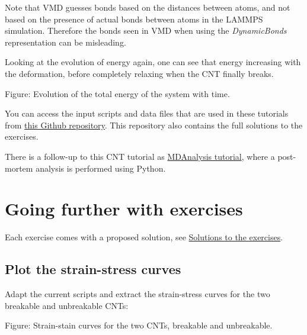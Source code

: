 \begin{tcolorbox}[colback=mylightblue!5!white,colframe=mylightblue!75!black,title=About bonds in VMD]

\vspace{0.25cm} \noindent Note that VMD guesses bonds based on the distances
between atoms, and not based on the presence of actual
bonds between atoms in the LAMMPS simulation. Therefore the bonds seen
in VMD when using the \textit{DynamicBonds} representation can be misleading.
\end{tcolorbox}

\noindent Looking at the evolution of energy again, one can see that energy increasing 
with the deformation, before completely relaxing when the CNT finally breaks.

\vspace{0.25cm} Figure: Evolution of the total energy of the system with time.

\vspace{0.25cm} \noindent You can access the input scripts and data files that
are used in these tutorials from \href{https://github.com/lammpstutorials/lammpstutorials-inputs/}{this Github repository}.
This repository also contains the full solutions to the exercises.

\vspace{0.25cm} \noindent There is a follow-up to this CNT tutorial as \hyperref[mda-label]{MDAnalysis tutorial},
where a post-mortem analysis is performed using Python.

\section{Going further with exercises}
\noindent Each exercise comes with a proposed solution, 
see \hyperref[solutions-label]{Solutions to the exercises}.

\subsection{Plot the strain-stress curves}
\noindent Adapt the current scripts and extract the strain-stress curves for
the two breakable and unbreakable CNTs:

\vspace{0.25cm} Figure: Strain-stain curves for the two CNTs, breakable and unbreakable.

